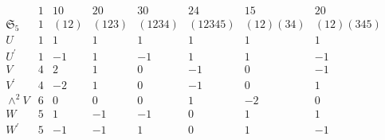 \documentclass[12pt, oneside]{book}
\begin{document}
\begin{example}
    \begin{equation*}
        \begin{array}{l|ccccccc}
                             & 1 & 10   & 20    & 30     & 24      & 15       & 20        \\
            \mathfrak{S}_{5} & 1 & (12) & (123) & (1234) & (12345) & (12)(34) & (12)(345) \\
            \hline
            U                & 1 & 1    & 1     & 1      & 1       & 1        & 1         \\
            U^{\prime}       & 1 & -1   & 1     & -1     & 1       & 1        & -1        \\
            V                & 4 & 2    & 1     & 0      & -1      & 0        & -1        \\
            V^{\prime}       & 4 & -2   & 1     & 0      & -1      & 0        & 1         \\
            \wedge^2 V       & 6 & 0    & 0     & 0      & 1       & -2       & 0         \\
            W                & 5 & 1    & -1    & -1     & 0       & 1        & 1         \\
            W^{\prime}       & 5 & -1   & -1    & 1      & 0       & 1        & -1        \\
        \end{array}
    \end{equation*}
\end{example}
\end{document}
